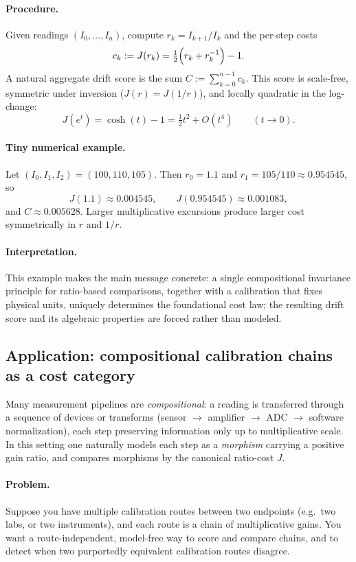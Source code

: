 \documentclass[11pt,reqno]{amsart}
\theoremstyle{plain}
\theoremstyle{definition}
\theoremstyle{remark}
\newcommand{\Jcost}{J}
\newcommand{\1}{\mathbf{1}}
\begin{document}
\paragraph{Procedure.}
Given readings $(I_0,\dots,I_n)$, compute $r_k=I_{k+1}/I_k$ and the per-step costs
\[
c_k:=J(r_k)=\tfrac12\Bigl(r_k+r_k^{-1}\Bigr)-1.
\]
A natural aggregate drift score is the sum $C:=\sum_{k=0}^{n-1} c_k$.  This score is scale-free, symmetric under
inversion ($J(r)=J(1/r)$), and locally quadratic in the log-change:
\[
J(e^t)=\cosh(t)-1=\tfrac12 t^2+O(t^4)\qquad (t\to 0).
\]

\paragraph{Tiny numerical example.}
Let $(I_0,I_1,I_2)=(100,110,105)$.  Then $r_0=1.1$ and $r_1=105/110\approx0.954545$, so
\[
J(1.1)\approx 0.004545,\qquad
J(0.954545)\approx 0.001083,
\]
and $C\approx 0.005628$.  Larger multiplicative excursions produce larger cost symmetrically in $r$ and $1/r$.

\paragraph{\textbf{Interpretation.}}
This example makes the main message concrete: a single compositional invariance principle for ratio-based
comparisons, together with a calibration that fixes physical units, uniquely determines the foundational
cost law; the resulting drift score and its algebraic properties are forced rather than modeled.


\subsection{Application: compositional calibration chains as a cost category}\label{subsec:app-calibration-category}
Many measurement pipelines are \emph{compositional}: a reading is transferred through a sequence of
devices or transforms (sensor $\rightarrow$ amplifier $\rightarrow$ ADC $\rightarrow$ software normalization),
each step preserving information only up to multiplicative scale.  In this setting one naturally models
each step as a \emph{morphism} carrying a positive gain ratio, and compares morphisms by the canonical
ratio-cost $\Jcost$.

\paragraph{\textbf{Problem.}}
Suppose you have multiple calibration routes between two endpoints (e.g.\ two labs, or two instruments),
and each route is a chain of multiplicative gains.  You want a route-independent, model-free way to
score and compare chains, and to detect when two purportedly equivalent calibration routes disagree.
\end{document}
